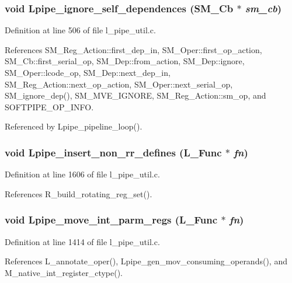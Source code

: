 \subsubsection{\setlength{\rightskip}{0pt plus 5cm}void Lpipe\_\-ignore\_\-self\_\-dependences (\bf{SM\_\-Cb} $\ast$ {\em sm\_\-cb})}\label{l__pipe__util_8c_fe0fa3d6120b61b121fc43231a6d890d}




Definition at line 506 of file l\_\-pipe\_\-util.c.

References SM\_\-Reg\_\-Action::first\_\-dep\_\-in, SM\_\-Oper::first\_\-op\_\-action, SM\_\-Cb::first\_\-serial\_\-op, SM\_\-Dep::from\_\-action, SM\_\-Dep::ignore, SM\_\-Oper::lcode\_\-op, SM\_\-Dep::next\_\-dep\_\-in, SM\_\-Reg\_\-Action::next\_\-op\_\-action, SM\_\-Oper::next\_\-serial\_\-op, SM\_\-ignore\_\-dep(), SM\_\-MVE\_\-IGNORE, SM\_\-Reg\_\-Action::sm\_\-op, and SOFTPIPE\_\-OP\_\-INFO.

Referenced by Lpipe\_\-pipeline\_\-loop().
\subsubsection{\setlength{\rightskip}{0pt plus 5cm}void Lpipe\_\-insert\_\-non\_\-rr\_\-defines (L\_\-Func $\ast$ {\em fn})}\label{l__pipe__util_8c_9746794fce95842da4036ab2dea2779a}




Definition at line 1606 of file l\_\-pipe\_\-util.c.

References R\_\-build\_\-rotating\_\-reg\_\-set().
\subsubsection{\setlength{\rightskip}{0pt plus 5cm}void Lpipe\_\-move\_\-int\_\-parm\_\-regs (L\_\-Func $\ast$ {\em fn})}\label{l__pipe__util_8c_b17b99684ef3a58402ade4ddb0129407}




Definition at line 1414 of file l\_\-pipe\_\-util.c.

References L\_\-annotate\_\-oper(), Lpipe\_\-gen\_\-mov\_\-consuming\_\-operands(), and M\_\-native\_\-int\_\-register\_\-ctype().
